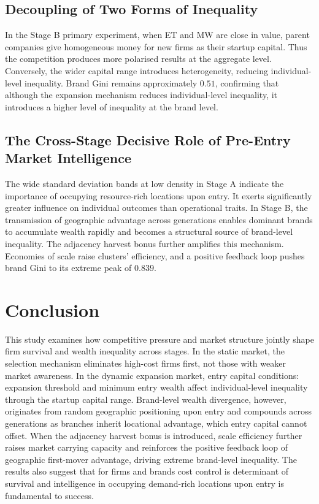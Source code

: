 \documentclass{article}
\begin{document}
\subsection{Decoupling of Two Forms of Inequality}

In the Stage B primary experiment, when ET and MW are close in value, parent companies give homogeneous money for new firms as their startup capital. Thus the competition produces more polarised results at the aggregate level. Conversely, the wider capital range introduces heterogeneity, reducing individual-level inequality. Brand Gini remains approximately $0.51$, confirming that although the expansion mechanism reduces individual-level inequality, it introduces a higher level of inequality at the brand level.

\subsection{The Cross-Stage Decisive Role of Pre-Entry Market Intelligence}

The wide standard deviation bands at low density in Stage A indicate the importance of occupying resource-rich locations upon entry. It exerts significantly greater influence on individual outcomes than operational traits. In Stage B, the transmission of geographic advantage across generations enables dominant brands to accumulate wealth rapidly and becomes a structural source of brand-level inequality. The adjacency harvest bonus further amplifies this mechanism. Economies of scale raise clusters’ efficiency, and a positive feedback loop pushes brand Gini to its extreme peak of $0.839$. 




\section{Conclusion}

This study examines how competitive pressure and market structure jointly shape firm survival and wealth inequality across stages. In the static market, the selection mechanism eliminates high-cost firms first, not those with weaker market awareness. In the dynamic expansion market, entry capital conditions: expansion threshold and minimum entry wealth affect individual-level inequality through the startup capital range. Brand-level wealth divergence, however, originates from random geographic positioning upon entry and compounds across generations as branches inherit locational advantage, which entry capital cannot offset. When the adjacency harvest bonus is introduced, scale efficiency further raises market carrying capacity and reinforces the positive feedback loop of geographic first-mover advantage, driving extreme brand-level inequality. The results also suggest that for firms and brands cost control is determinant of survival and intelligence in occupying demand-rich locations upon entry is fundamental to success.
\end{document}
